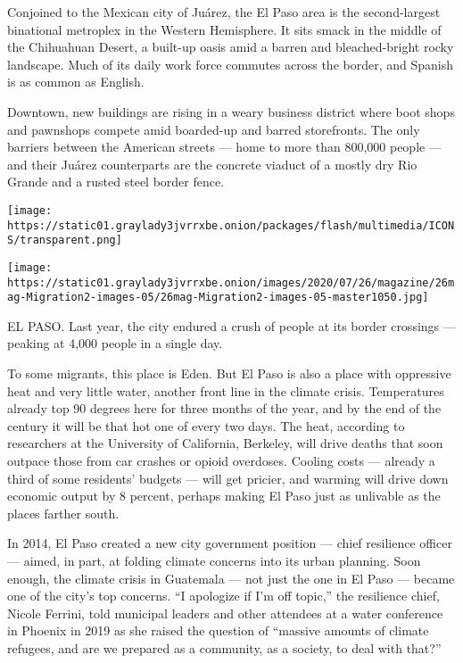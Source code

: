 Conjoined to the Mexican city of Juárez, the El Paso area is the
second-largest binational metroplex in the Western Hemisphere. It sits
smack in the middle of the Chihuahuan Desert, a built-up oasis amid a
barren and bleached-bright rocky landscape. Much of its daily work force
commutes across the border, and Spanish is as common as English.

Downtown, new buildings are rising in a weary business district where
boot shops and pawnshops compete amid boarded-up and barred storefronts.
The only barriers between the American streets --- home to more than
800,000 people --- and their Juárez counterparts are the concrete
viaduct of a mostly dry Rio Grande and a rusted steel border fence.

\texttt{[image: https://static01.graylady3jvrrxbe.onion/packages/flash/multimedia/ICONS/transparent.png]}

\texttt{[image: https://static01.graylady3jvrrxbe.onion/images/2020/07/26/magazine/26mag-Migration2-images-05/26mag-Migration2-images-05-master1050.jpg]}

EL PASO. Last year, the city endured a crush of people at its border
crossings --- peaking at 4,000 people in a single day.

To some migrants, this place is Eden. But El Paso is also a place with
oppressive heat and very little water, another front line in the climate
crisis. Temperatures already top 90 degrees here for three months of the
year, and by the end of the century it will be that hot one of every two
days. The heat, according to researchers at the University of
California, Berkeley, will drive deaths that soon outpace those from car
crashes or opioid overdoses. Cooling costs --- already a third of some
residents' budgets --- will get pricier, and warming will drive down
economic output by 8 percent, perhaps making El Paso just as unlivable
as the places farther south.

In 2014, El Paso created a new city government position --- chief
resilience officer --- aimed, in part, at folding climate concerns into
its urban planning. Soon enough, the climate crisis in Guatemala --- not
just the one in El Paso --- became one of the city's top concerns. ``I
apologize if I'm off topic,'' the resilience chief, Nicole Ferrini, told
municipal leaders and other attendees at a water conference in Phoenix
in 2019 as she raised the question of ``massive amounts of climate
refugees, and are we prepared as a community, as a society, to deal with
that?''

